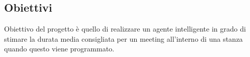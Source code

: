 \subsection{Obiettivi}
\fancyhead{}    %
\par{
Obiettivo del progetto è quello di realizzare un agente intelligente in grado di stimare la durata media consigliata per un meeting all'interno di una stanza quando questo viene programmato.
}